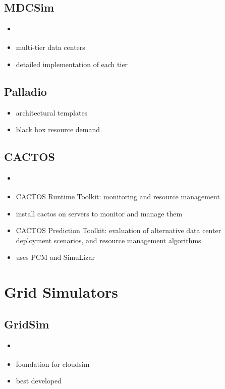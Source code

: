 \subsection{MDCSim}
\begin{itemize}
	\item \cite{mdcsim}
	\item multi-tier data centers
	\item detailed implementation of each tier
\end{itemize}

\subsection{Palladio}
\begin{itemize}
	\item architectural templates \cite{arch}
	\item black box resource demand \cite{blackbox}
\end{itemize}


\subsection{CACTOS}
\begin{itemize}
	\item \cite{cactos}
	\item CACTOS Runtime Toolkit: monitoring and resource management
	\item install cactos on servers to monitor and manage them
	\item CACTOS Prediction Toolkit: evaluation of alternative data center
	deployment scenarios, and resource management algorithms
	\item uses PCM and SimuLizar
\end{itemize}

\section{Grid Simulators}
\subsection{GridSim}
\begin{itemize}
	\item \cite{gridsim}
	\item foundation for cloudsim
	\item best developed
\end{itemize}

